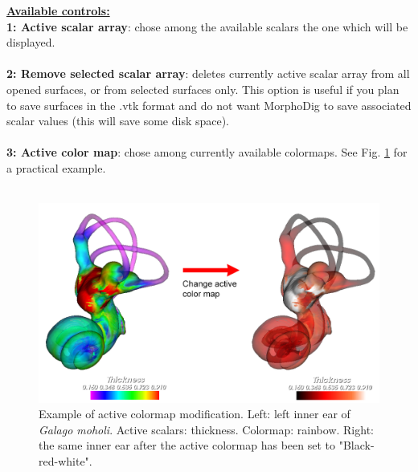 \noindent
\textbf{\underline{Available controls:}}\\
\textbf{1: Active scalar array}: chose among the available scalars the one which will be displayed.\\\\
\noindent
\textbf{2: Remove selected scalar array}: deletes currently active scalar array from all opened surfaces, or  from selected surfaces only. This option is useful if you plan to save surfaces in the .vtk format and do not want MorphoDig to save associated scalar values (this will save some disk space).\\\\
\noindent
\textbf{3: Active color map}: chose among currently available colormaps. See Fig. \ref{change_active_color_map} for a practical example. \\\\

\begin{figure}
  \centering
  \includegraphics[scale=0.38]{images/11/change_active_color_map.png} 
	\caption{
Example of active colormap modification.  Left: left inner ear of \textit{Galago moholi}. Active scalars: thickness. Colormap: rainbow. Right: the same inner ear after the active colormap has been set to "Black-red-white".}
\label{change_active_color_map}
 \end{figure}


